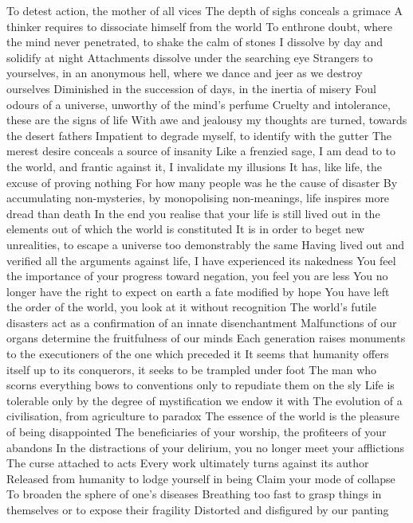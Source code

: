 \documentclass{article}
\begin{document}
To detest action, the mother of all vices
The depth of sighs conceals a grimace
A thinker requires to dissociate himself from the world
To enthrone doubt, where the mind never penetrated, to shake the calm of stones
I dissolve by day and solidify at night
Attachments dissolve under the searching eye
Strangers to yourselves, in an anonymous hell, where we dance and jeer as we destroy ourselves
Diminished in the succession of days, in the inertia of misery
Foul odours of a universe, unworthy of the mind's perfume
Cruelty and intolerance, these are the signs of life
With awe and jealousy my thoughts are turned, towards the desert fathers
Impatient to degrade myself, to identify with the gutter
The merest desire conceals a source of insanity
Like a frenzied sage, I am dead to to the world, and frantic against it, I invalidate my illusions
It has, like life, the excuse of proving nothing
For how many people was he the cause of disaster
By accumulating non-mysteries, by monopolising non-meanings, life inspires more dread than death
In the end you realise that your life is still lived out in the elements out of which the world is constituted
It is in order to beget new unrealities, to escape a universe too demonstrably the same
Having lived out and verified all the arguments against life, I have experienced its nakedness
You feel the importance of your progress toward negation, you feel you are less
You no longer have the right to expect on earth a fate modified by hope
You have left the order of the world, you look at it without recognition
The world's futile disasters act as a confirmation of an innate disenchantment
Malfunctions of our organs determine the fruitfulness of our minds
Each generation raises monuments to the executioners of the one which preceded it
It seems that humanity offers itself up to its conquerors, it seeks to be trampled under foot
The man who scorns everything bows to conventions only to repudiate them on the sly
Life is tolerable only by the degree of mystification we endow it with
The evolution of a civilisation, from agriculture to paradox
The essence of the world is the pleasure of being disappointed
The beneficiaries of your worship, the profiteers of your abandons
In the distractions of your delirium, you no longer meet your afflictions
The curse attached to acts
Every work ultimately turns against its author
Released from humanity to lodge yourself in being
Claim your mode of collapse
To broaden the sphere of one's diseases
Breathing too fast to grasp things in themselves or to expose their fragility
Distorted and disfigured by our panting
\end{document}
